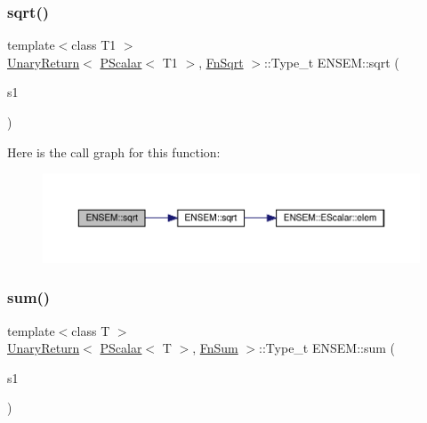 \subsubsection{\texorpdfstring{sqrt()}{sqrt()}}
{\footnotesize\ttfamily template$<$class T1 $>$ \\
\mbox{\hyperlink{structENSEM_1_1UnaryReturn}{Unary\+Return}}$<$ \mbox{\hyperlink{classENSEM_1_1PScalar}{P\+Scalar}}$<$ T1 $>$, \mbox{\hyperlink{structENSEM_1_1FnSqrt}{Fn\+Sqrt}} $>$\+::Type\+\_\+t E\+N\+S\+E\+M\+::sqrt (\begin{DoxyParamCaption}\item[{const \mbox{\hyperlink{classENSEM_1_1PScalar}{P\+Scalar}}$<$ T1 $>$ \&}]{s1 }\end{DoxyParamCaption})\hspace{0.3cm}{\ttfamily [inline]}}

Here is the call graph for this function\+:\nopagebreak
\begin{figure}[H]
\begin{center}
\leavevmode
\includegraphics[width=350pt]{db/dcc/group__primscalar_ga07f86503a0138d56e1948dd554ec3e10_cgraph}
\end{center}
\end{figure}
\mbox{\label{group__primscalar_gaa2733f98f3fc41be9ea11939aa1ee01b}} 
\subsubsection{\texorpdfstring{sum()}{sum()}}
{\footnotesize\ttfamily template$<$class T $>$ \\
\mbox{\hyperlink{structENSEM_1_1UnaryReturn}{Unary\+Return}}$<$ \mbox{\hyperlink{classENSEM_1_1PScalar}{P\+Scalar}}$<$ T $>$, \mbox{\hyperlink{structENSEM_1_1FnSum}{Fn\+Sum}} $>$\+::Type\+\_\+t E\+N\+S\+E\+M\+::sum (\begin{DoxyParamCaption}\item[{const \mbox{\hyperlink{classENSEM_1_1PScalar}{P\+Scalar}}$<$ T $>$ \&}]{s1 }\end{DoxyParamCaption})\hspace{0.3cm}{\ttfamily [inline]}}

